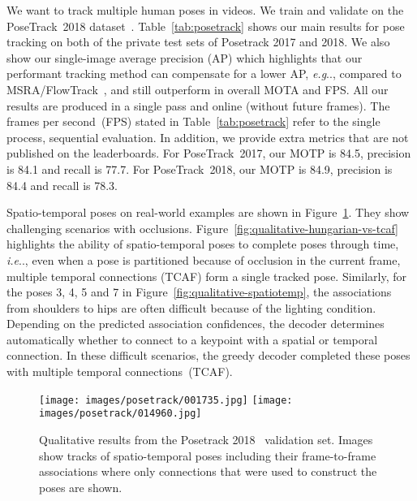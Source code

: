 \documentclass[journal]{IEEEtran}
\makeatletter
\newcommand{\hl}[1]{#1}
\DeclareRobustCommand\onedot{\futurelet\@let@token\@onedot}
\def\@onedot{\ifx\@let@token.\else.\null\fi\xspace}
\def\eg{\emph{e.g}\onedot} \def\Eg{\emph{E.g}\onedot}
\def\ie{\emph{i.e}\onedot} \def\Ie{\emph{I.e}\onedot}
\makeatother
\begin{document}
We want to track multiple human poses in videos. We train and validate
on the PoseTrack~2018 dataset~\cite{andriluka2018posetrack}.
Table~\ref{tab:posetrack} shows our main results for pose tracking
on both of the private test sets of Posetrack 2017 and 2018.
\hl{We also show our single-image average precision (AP) which highlights
that our performant tracking method can compensate for a lower AP, \eg,
compared to MSRA/FlowTrack~\cite{xiao2018simple}, and still outperform
in overall MOTA and FPS.}
All our results are produced in a single pass and online (without future frames).
The frames per second~(FPS) stated in
Table~\ref{tab:posetrack} refer to the single process, sequential
evaluation.
In addition, we provide extra metrics that are not published
on the leaderboards. For PoseTrack~2017, our MOTP is 84.5, precision is 84.1
and recall is 77.7. For PoseTrack~2018, our MOTP is 84.9, precision is 84.4
and recall is 78.3.



Spatio-temporal poses on real-world examples are shown in
Figure~\ref{fig:qualitative}. They show challenging scenarios
with occlusions.
Figure~\ref{fig:qualitative-hungarian-vs-tcaf} highlights the ability of spatio-temporal poses to complete
poses through time, \ie, even when a pose is partitioned because of occlusion
in the current frame, multiple temporal connections (TCAF) form a single tracked pose.
Similarly, for the poses 3, 4, 5 and 7 in Figure~\ref{fig:qualitative-spatiotemp},
the
associations from shoulders to hips are often difficult because of the lighting
condition.
Depending on the predicted association confidences, the decoder determines
automatically whether to connect to a keypoint with a spatial or temporal
connection.
In these difficult scenarios, the greedy decoder
completed these poses with multiple temporal connections~(TCAF).


\begin{figure}
  \centering
\texttt{[image: images/posetrack/001735.jpg]}
\texttt{[image: images/posetrack/014960.jpg]}
  \caption{
    Qualitative results from the Posetrack 2018~\cite{andriluka2018posetrack}
    validation set.
Images show tracks of spatio-temporal poses including their frame-to-frame
    associations where only connections that
    were used to construct the poses are shown.
  }
  \label{fig:qualitative}
\end{figure}
\end{document}
